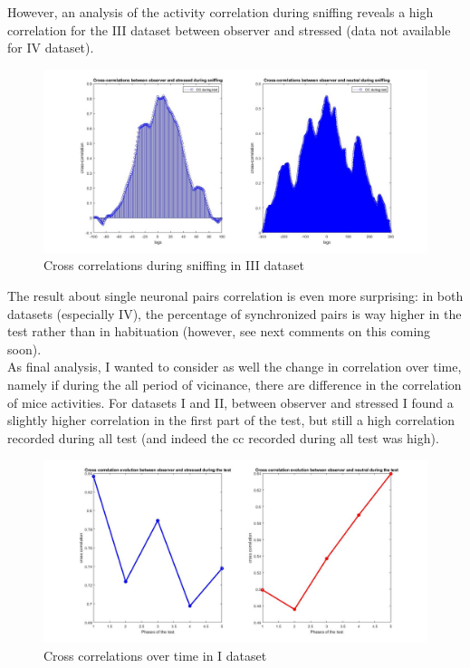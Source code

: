 \documentclass[a4paper]{article}
\begin{document}
	
	
	However, an analysis of the activity correlation during sniffing reveals a high correlation for the III dataset between observer and stressed (data not available for IV dataset).
	
	
	\begin{figure}[H]
		\begin{center}
			\hspace*{-1cm}
			\includegraphics[scale=.32]{sniff3.jpg} 
		\end{center}  
		\caption{Cross correlations during sniffing in III dataset}
	\end{figure}
	
	
	
	
The result about single neuronal pairs correlation is even more surprising: in both datasets (especially IV), the percentage of synchronized pairs is way higher in the test rather than in habituation (however, see next comments on this coming soon). \\
	
As final analysis, I wanted to consider as well the change in correlation over time, namely if during the all period of vicinance, there are difference in the correlation of mice activities. For datasets I and II, between observer and stressed I found a slightly higher correlation in the first part of the test, but still a high correlation recorded during all test (and indeed the cc recorded during all test was high).


		\begin{figure}[H]
		\begin{center}
			\hspace*{-1cm}
			\includegraphics[scale=.36]{corr_time.jpg} 
		\end{center}  
		\caption{Cross correlations over time in I dataset}
		
	\end{figure}
\end{document}
